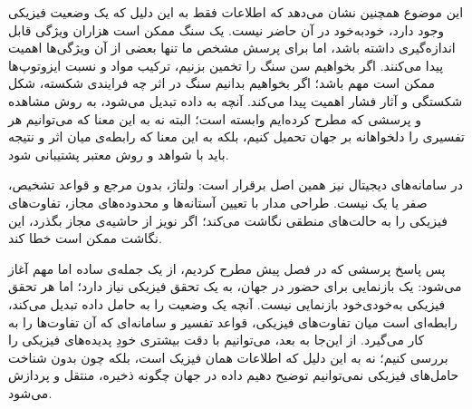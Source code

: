 این موضوع همچنین نشان می‌دهد که اطلاعات فقط به این دلیل که یک وضعیت فیزیکی وجود دارد، خودبه‌خود در آن حاضر نیست. یک سنگ ممکن است هزاران ویژگی قابل اندازه‌گیری داشته باشد، اما برای پرسش مشخص ما تنها بعضی از آن ویژگی‌ها اهمیت پیدا می‌کنند. اگر بخواهیم سن سنگ را تخمین بزنیم، ترکیب مواد و نسبت ایزوتوپ‌ها ممکن است مهم باشد؛ اگر بخواهیم بدانیم سنگ در اثر چه فرایندی شکسته، شکل شکستگی و آثار فشار اهمیت پیدا می‌کند. آنچه به داده تبدیل می‌شود، به روش مشاهده و پرسشی که مطرح کرده‌ایم وابسته است؛ البته نه به این معنا که می‌توانیم هر تفسیری را دلخواهانه بر جهان تحمیل کنیم، بلکه به این معنا که رابطه‌ی میان اثر و نتیجه باید با شواهد و روش معتبر پشتیبانی شود.

در سامانه‌های دیجیتال نیز همین اصل برقرار است: ولتاژ، بدون مرجع و قواعد تشخیص، صفر یا یک نیست. طراحی مدار با تعیین آستانه‌ها و محدوده‌های مجاز، تفاوت‌های فیزیکی را به حالت‌های منطقی نگاشت می‌کند؛ اگر نویز از حاشیه‌ی مجاز بگذرد، این نگاشت ممکن است خطا کند.

پس پاسخ پرسشی که در فصل پیش مطرح کردیم، از یک جمله‌ی ساده اما مهم آغاز می‌شود: یک بازنمایی برای حضور در جهان، به یک تحقق فیزیکی نیاز دارد؛ اما هر تحقق فیزیکی به‌خودی‌خود بازنمایی نیست. آنچه یک وضعیت را به حامل داده تبدیل می‌کند، رابطه‌ای است میان تفاوت‌های فیزیکی، قواعد تفسیر و سامانه‌ای که آن تفاوت‌ها را به کار می‌گیرد. از این‌جا به بعد، می‌توانیم با دقت بیشتری خودِ پدیده‌های فیزیکی را بررسی کنیم؛ نه به این دلیل که اطلاعات همان فیزیک است، بلکه چون بدون شناخت حامل‌های فیزیکی نمی‌توانیم توضیح دهیم داده در جهان چگونه ذخیره، منتقل و پردازش می‌شود.